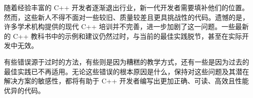 
随着经验丰富的 C++ 开发者逐渐退出行业，新一代开发者需要填补他们的位置。然而，这些新人不得不面对一些较旧、质量较差且更具挑战性的代码。遗憾的是，许多学术机构提供的现代 C++ 培训并不完善，进一步加剧了这一问题。一些最新的 C++ 教科书中的示例和建议仍然过时，与当前的最佳实践脱节，甚至在实际开发中无效。

有些错误源于过时的方法，有些则是因为糟糕的教学方式，还有一些是因为过去的最佳实践已不再适用。无论这些错误的根本原因是什么，保持对这些问题及其潜在解决方案的敏感性，都将有助于 C++ 开发者编写出更加正确、可读、高效且性能优异的代码。


